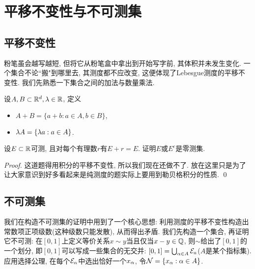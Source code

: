 \section{平移不变性与不可测集}
\subsection{平移不变性}
粉笔虽会越写越短, 但将它从粉笔盒中拿出到开始写字前, 其体积并未发生变化. 一个集合不论``搬"到哪里去, 其测度都不应改变, 这便体现了Lebesgue测度的平移不变性. 
我们先熟悉一下集合之间的加法与数量乘法.
\begin{definition}
    设$A, B \subset \mathbb{R}^d, \lambda \in \mathbb{R}$, 定义
    \begin{itemize}
    \item $A+B=\{a+b: a\in A, b\in B\}$,
    \item $\lambda A = \{\lambda a: a \in A\}$.
    \end{itemize}
\end{definition}


\begin{example}
    设$E \subset \mathbb{R}$可测, 且对每个有理数$r$有$E+r=E$. 证明$E$或$E^c$是零测集.
\end{example}
\begin{proof}
    这道题得用积分的平移不变性, 所以我们现在还做不了. 放在这里只是为了让大家意识到好多看起来是纯测度的题实际上要用到勒贝格积分的性质. \qed     
\end{proof}

\subsection{不可测集}
我们在构造不可测集的证明中用到了一个核心思想: 利用测度的平移不变性构造出常数项正项级数(这种级数只能发散), 从而得出矛盾. 
我们先构造一个集合, 再证明它不可测:
在$[0,1]$上定义等价关系$x \sim y$当且仅当$x-y \in \mathbb{Q}$,
则$\sim$给出了$[0,1]$的一个划分, 即$[0,1]$可以写成一些集合的无交并:
$[0,1]=\bigcup_{\alpha \in A} \mathcal{E}_a$($A$是某个指标集). 应用选择公理, 在每个$\mathcal{E}_\alpha$中选出恰好一个$x_\alpha$, 令$\mathcal{N} = \{x_\alpha: \alpha \in A\}$.

